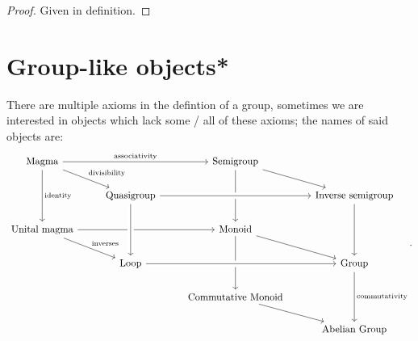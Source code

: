\documentclass[../Year1.tex]{subfiles}
\begin{document}
\begin{proof}
    Given in definition.
\end{proof}

\section{Group-like objects*}

\begin{definition}
    There are multiple axioms in the defintion of a group, sometimes we are interested in objects which lack some / all of these axioms; the names of said objects are:
    \[
        \begin{tikzcd}
            \text{Magma} \arrow[rr, "\text{associativity}"] \arrow[rd, "\text{divisibility}"] \arrow[dd, "\text{identity}"] & & \text{Semigroup} \arrow[rd] \arrow[dd] \\
            & \text{Quasigroup} \arrow[rr, crossing over] & & \text{Inverse semigroup} \arrow[dd]\\
            \text{Unital magma} \arrow[rr] \arrow[rd, "\text{inverses}"] & & \text{Monoid} \arrow[rd] \arrow[dd]\\
            & \text{Loop} \arrow[from=uu, crossing over] \arrow[rr, crossing over] & & \text{Group} \arrow[dd, "\text{commutativity}"]\\
            & & \text{Commutative Monoid} \arrow[rd] \\
            & & & \text{Abelian Group}
        \end{tikzcd}
    \textcolor{black}{.}
    \]
\end{definition}
\end{document}
